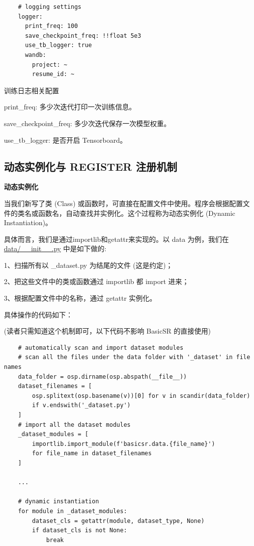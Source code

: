 \documentclass[../main.tex]{subfiles}
\begin{document}
    \begin{verbatim}
    # logging settings
    logger:
      print_freq: 100
      save_checkpoint_freq: !!float 5e3
      use_tb_logger: true
      wandb:
        project: ~
        resume_id: ~
    \end{verbatim}
    \begin{exampleBox}[righthand ratio=0.00, sidebyside, sidebyside align=center, lower separated=false]{训练日志相关配置}

    print\_freq: 多少次迭代打印一次训练信息。

    save\_checkpoint\_freq: 多少次迭代保存一次模型权重。

    use\_tb\_logger: 是否开启 Tensorboard。
    \end{exampleBox}

    \subsection{动态实例化与 REGISTER 注册机制}
    \textbf{动态实例化}

    当我们新写了类 (Class) 或函数时，可直接在配置文件中使用。程序会根据配置文件的类名或函数名，自动查找并实例化。这个过程称为动态实例化 (Dynamic Instantiation)。

    具体而言，我们是通过importlib和getattr来实现的。以 data 为例，我们在 \href{https://github.com/XPixelGroup/BasicSR/blob/master/basicsr/data/__init__.py}{data/\_\_init\_\_.py} 中是如下做的:

    1、扫描所有以 \_dataset.py 为结尾的文件 (这是约定)；

    2、把这些文件中的类或函数通过 importlib 都 import 进来；

    3、根据配置文件中的名称，通过 getattr 实例化。

    具体操作的代码如下：

    (读者只需知道这个机制即可，以下代码不影响 BasicSR 的直接使用)
    \begin{verbatim}
    # automatically scan and import dataset modules
    # scan all the files under the data folder with '_dataset' in file names
    data_folder = osp.dirname(osp.abspath(__file__))
    dataset_filenames = [
        osp.splitext(osp.basename(v))[0] for v in scandir(data_folder)
        if v.endswith('_dataset.py')
    ]
    # import all the dataset modules
    _dataset_modules = [
        importlib.import_module(f'basicsr.data.{file_name}')
        for file_name in dataset_filenames
    ]

    ...

    # dynamic instantiation
    for module in _dataset_modules:
        dataset_cls = getattr(module, dataset_type, None)
        if dataset_cls is not None:
            break
    \end{verbatim}
\end{document}
